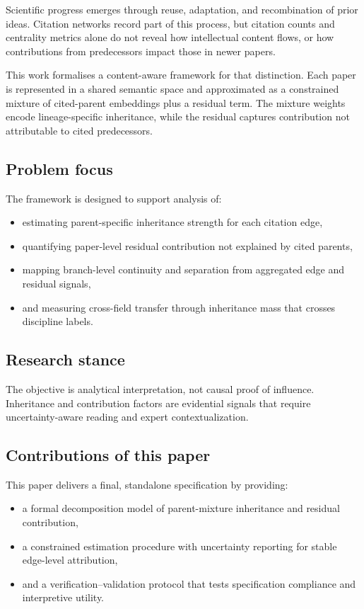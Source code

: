 Scientific progress emerges through reuse, adaptation, and recombination of prior ideas. Citation networks record part of this process, but citation counts and centrality metrics alone do not reveal how intellectual content flows, or how contributions from  predecessors impact those in newer papers.

This work formalises a content-aware framework for that distinction. Each paper is represented in a shared semantic space and approximated as a constrained mixture of cited-parent embeddings plus a residual term. The mixture weights encode lineage-specific inheritance, while the residual captures contribution not attributable to cited predecessors.

\subsection{Problem focus}
The framework is designed to support analysis of:
\begin{itemize}
    \item estimating parent-specific inheritance strength for each citation edge,
    \item quantifying paper-level residual contribution not explained by cited parents,
    \item mapping branch-level continuity and separation from aggregated edge and residual signals,
    \item and measuring cross-field transfer through inheritance mass that crosses discipline labels.
\end{itemize}

\subsection{Research stance}
The objective is analytical interpretation, not causal proof of influence. Inheritance and contribution factors are evidential signals that require uncertainty-aware reading and expert contextualization.

\subsection{Contributions of this paper}
This paper delivers a final, standalone specification by providing:
\begin{itemize}
    \item a formal decomposition model of parent-mixture inheritance and residual contribution,
    \item a constrained estimation procedure with uncertainty reporting for stable edge-level attribution,
    \item and a verification--validation protocol that tests specification compliance and interpretive utility.
\end{itemize}

